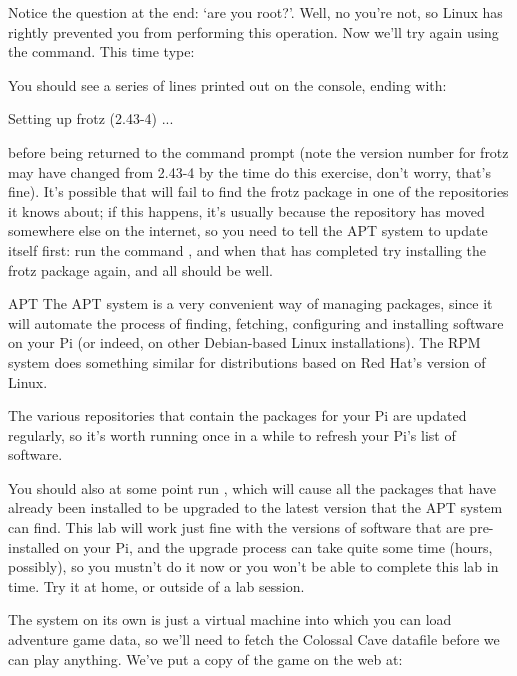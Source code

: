 Notice the question at the end: `are you root?'. Well, no you're not, so Linux has rightly prevented you from performing this operation. Now we'll try again using the  command. This time type:


You should see a series of lines printed out on the console, ending with:

\begin{ttoutenv}
Setting up frotz (2.43-4) ...
\end{ttoutenv}

\noindent before being returned to the command prompt (note the version number for frotz may have changed from 2.43-4 by the time do this exercise, don't worry, that's fine). It's possible that  will fail to find the frotz package in one of the repositories it knows about; if this happens, it's usually because the repository has moved somewhere else on the internet, so you need to tell the APT system to update itself first: run the command , and when that has completed try installing the frotz package again, and all should be well. 

\begin{rpi}{APT}
The APT system is a very convenient way of managing packages, since it will automate the process of finding, fetching, configuring and installing software on your Pi (or indeed, on other Debian-based Linux installations). The RPM system does something similar for distributions based on Red Hat's version of Linux.

The various repositories that contain the packages for your Pi are updated regularly, so it's worth running  once in a while to refresh your Pi's list of software. 

You should also at some point run , which will cause all the packages that have already been installed to be upgraded to the latest version that the APT system can find. This lab will work just fine with the versions of software that are pre-installed on your Pi, and the upgrade process can take quite some time (hours, possibly), so you mustn't do it now or you won't be able to complete this lab in time. Try it at home, or outside of a lab session. 
\end{rpi}

The  system on its own is just a virtual machine into which you can load adventure game data, so we'll need to fetch the Colossal Cave datafile before we can play anything. We've put a copy of the game on the web at:

